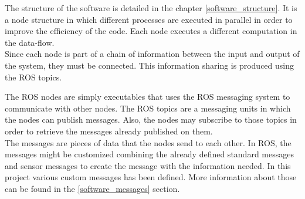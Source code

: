 The structure of the software is detailed in the chapter \ref{software_structure}.  It is a node structure in which different processes are executed in parallel in order to improve the efficiency of the code. Each node executes a different computation in the data-flow. 
\\

Since each node is part of a chain of information between the input and output of the system, they must be connected. This information sharing is produced using the ROS topics. 


The ROS nodes are simply executables that uses the ROS messaging system to communicate with other nodes. The ROS topics are a messaging units in which the nodes can publish messages. Also, the nodes may subscribe to those topics in order to retrieve the messages already published on them. 
\\

The messages are pieces of data that the nodes send to each other. In ROS, the messages might be customized combining the already defined standard messages and sensor messages to create the message with the information needed. In this project various custom messages has been defined. More information about those can be found in the \ref{software_messages} section. 

